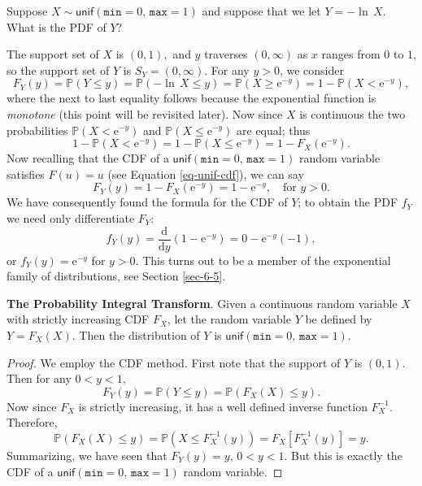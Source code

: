 \documentclass[captions=tableheading]{scrbook}
\begin{document}
\begin{example}
Suppose \(X\sim\mathsf{unif}(\mathtt{min}=0,\,\mathtt{max}=1)\) and
suppose that we let \(Y=-\ln\, X\). What is the PDF of \(Y\)?

The support set of \(X\) is \((0,1),\) and \(y\) traverses \((0,\infty)\) as \(x\) ranges from \(0\) to \(1\), so the support set of \(Y\) is \(S_{Y}=(0,\infty)\). For any \(y>0\), we consider
\[
F_{Y}(y)=\mathbb{P}(Y\leq y)=\mathbb{P}(-\ln\, X\leq y)=\mathbb{P}(X\geq\mathrm{e}^{-y})=1-\mathbb{P}(X<\mathrm{e}^{-y}),
\]
where the next to last equality follows because the exponential function is \emph{monotone} (this point will be revisited later). Now since \(X\) is continuous the two probabilities \(\mathbb{P}(X<\mathrm{e}^{-y})\) and \(\mathbb{P}(X\leq\mathrm{e}^{-y})\) are equal; thus
\[
1-\mathbb{P}(X < \mathrm{e}^{-y})=1-\mathbb{P}(X\leq\mathrm{e}^{-y})=1-F_{X}(\mathrm{e}^{-y}).
\]
Now recalling that the CDF of a \(\mathsf{unif}(\mathtt{min}=0,\,\mathtt{max}=1)\) random variable satisfies \(F(u)=u\) (see Equation \ref{eq-unif-cdf}), we can say
\[
F_{Y}(y)=1-F_{X}(\mathrm{e}^{-y})=1-\mathrm{e}^{-y},\quad \mbox{for }y>0.
\]
We have consequently found the formula for the CDF of \(Y\); to obtain the PDF \(f_{Y}\) we need only differentiate \(F_{Y}\):
\[
f_{Y}(y)=\frac{\mathrm{d}}{\mathrm{d} y}\left(1-\mathrm{e}^{-y}\right)=0-\mathrm{e}^{-y}(-1),
\]
or \(f_{Y}(y)=\mathrm{e}^{-y}\) for \(y>0\). This turns out to be a member of the exponential family of distributions, see Section \ref{sec-6-5}. 
\end{example}

\begin{example}
\textbf{The Probability Integral Transform}. Given a continuous random variable \(X\) with strictly increasing CDF \(F_{X}\), let the random variable \(Y\) be defined by \(Y=F_{X}(X)\). Then the distribution of \(Y\) is \(\mathsf{unif}(\mathtt{min}=0,\,\mathtt{max}=1)\).
\end{example}

\begin{proof}
We employ the CDF method. First note that the support of \(Y\) is \((0,1)\). Then for any \(0<y<1\),
\[
F_{Y}(y)=\mathbb{P}(Y\leq y)=\mathbb{P}(F_{X}(X)\leq y).
\]
Now since \(F_{X}\) is strictly increasing, it has a well defined inverse function \(F_{X}^{-1}\). Therefore,
\[
\mathbb{P}(F_{X}(X)\leq y)=\mathbb{P}(X\leq F_{X}^{-1}(y))=F_{X}[F_{X}^{-1}(y)]=y.
\]
Summarizing, we have seen that \(F_{Y}(y)=y\), \(0<y<1\). But this is exactly the CDF of a \(\mathsf{unif}(\mathtt{min}=0,\,\mathtt{max}=1)\) random variable. 
\end{proof}
\end{document}
